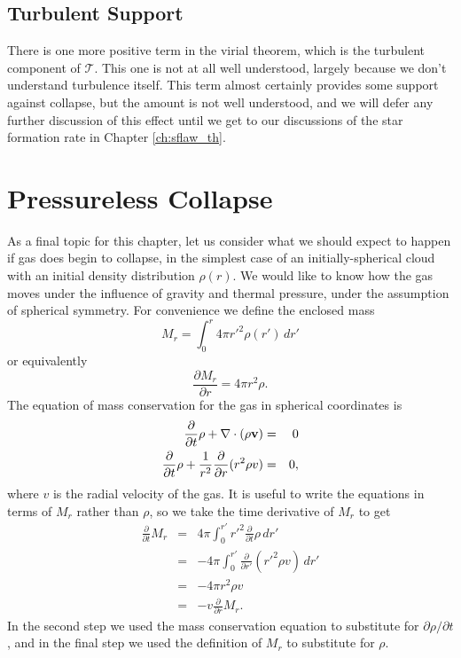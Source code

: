 \subsection{Turbulent Support}

There is one more positive term in the virial theorem, which is the turbulent component of $\mathcal{T}$. This one is not at all well understood, largely because we don't understand turbulence itself. This term almost certainly provides some support against collapse, but the amount is not well understood, and we will defer any further discussion of this effect until we get to our discussions of the star formation rate in Chapter \ref{ch:sflaw_th}.

\section{Pressureless Collapse}
\label{sec:pressureless_collapse}

As a final topic for this chapter, let us consider what we should expect to happen if gas does begin to collapse, in the simplest case of an initially-spherical cloud with an initial density distribution $\rho(r)$. We would like to know how the gas moves under the influence of gravity and thermal pressure, under the assumption of spherical symmetry. For convenience we define the enclosed mass
\begin{equation}
M_r =  \int_0^r 4\pi r'^2 \rho(r') \, dr'
\end{equation}
or equivalently
\begin{equation}
\frac{\partial M_r}{\partial r} = 4\pi r^2 \rho.
\end{equation}
The equation of mass conservation for the gas in spherical coordinates is
\begin{eqnarray}
\frac{\partial}{\partial t} \rho + \nabla\cdot (\rho \mathbf{v}) & = & 0 \\
\frac{\partial}{\partial t} \rho + \frac{1}{r^2}\frac{\partial}{\partial r}(r^2 \rho v) & = & 0,
\end{eqnarray}
where $v$ is the radial velocity of the gas. It is useful to write the equations in terms of $M_r$ rather than $\rho$, so we take the time derivative of $M_r$ to get
\begin{eqnarray}
\frac{\partial}{\partial t}M_r & = & 4\pi \int_{0}^{r'} r'^2 \frac{\partial}{\partial t} \rho \,dr' \\
& = & -4\pi \int_{0}^{r'} \frac{\partial}{\partial r'}(r'^2 \rho v)\, dr' \\
& = & -4\pi r^2 \rho v \\
& = & -v \frac{\partial}{\partial r}M_r.
\end{eqnarray}
In the second step we used the mass conservation equation to substitute for $\partial \rho/\partial t$, and in the final step we used the definition of $M_r$ to substitute for $\rho$.

